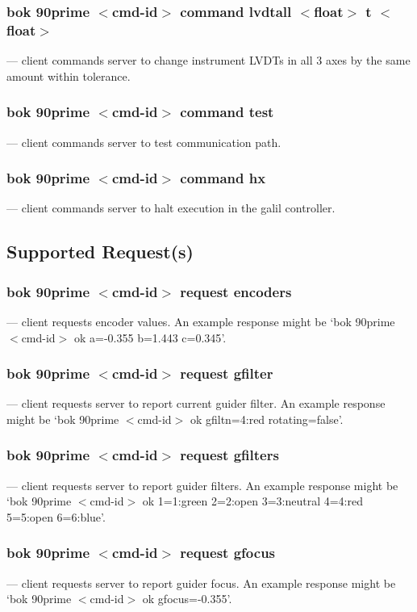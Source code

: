 \documentclass[12pt,twoside]{article}
\begin{document}
\subsubsection{bok 90prime $<$cmd-id$>$ command lvdtall $<$float$>$ t $<$float$>$}
  --- client commands server to change instrument LVDTs in all 3 axes by the same amount within tolerance.
 
\subsubsection{bok 90prime $<$cmd-id$>$ command test}
  --- client commands server to test communication path.
 
\subsubsection{bok 90prime $<$cmd-id$>$ command hx}
  --- client commands server to halt execution in the galil controller.
 
\subsection{Supported Request(s)}

\subsubsection{bok 90prime $<$cmd-id$>$ request encoders}
  --- client requests encoder values. An example response might be `{\sc bok 90prime $<$cmd-id$>$ ok a=-0.355 b=1.443 c=0.345}'.

\subsubsection{bok 90prime $<$cmd-id$>$ request gfilter}
  --- client requests server to report current guider filter. An example response might be `{\sc bok 90prime $<$cmd-id$>$ ok gfiltn=4:red rotating=false}'.

\subsubsection{bok 90prime $<$cmd-id$>$ request gfilters}
  --- client requests server to report guider filters. An example response might be `{\sc bok 90prime $<$cmd-id$>$ ok 1=1:green 2=2:open 3=3:neutral 4=4:red 5=5:open 6=6:blue}'.

\subsubsection{bok 90prime $<$cmd-id$>$ request gfocus}
  --- client requests server to report guider focus. An example response might be `{\sc bok 90prime $<$cmd-id$>$ ok gfocus=-0.355}'.
\end{document}
